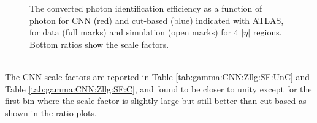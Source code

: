 \begin{figure}[htbp]
	\begin{tcolorbox}[colback=black!5!white,colframe=white!75!black]
    \caption{The converted photon identification efficiency as a function of photon \eT for CNN (red) and cut-based (blue) indicated with ATLAS, for data (full marks) and simulation (open marks) for 4 $|\eta|$ regions. Bottom ratios show the scale factors.}
    \label{fig:gamma:CNN:Zllg:Energy:C}
    \end{tcolorbox}
\end{figure}
\\
The CNN scale factors are reported in Table \ref{tab:gamma:CNN:Zllg:SF:UnC} and Table \ref{tab:gamma:CNN:Zllg:SF:C}, and found to be closer to unity except for the first \eT bin where the scale factor is slightly large but still better than cut-based as shown in the ratio plots. 
